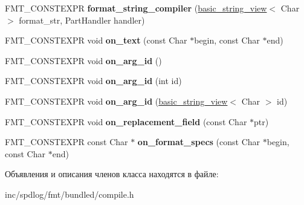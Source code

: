 \begin{DoxyCompactItemize}
\item 
\mbox{\label{classinternal_1_1format__string__compiler_a349271d053dded6e67e59e7a1b8a06c8}} 
F\+M\+T\+\_\+\+C\+O\+N\+S\+T\+E\+X\+PR {\bfseries format\+\_\+string\+\_\+compiler} (\hyperlink{classbasic__string__view}{basic\+\_\+string\+\_\+view}$<$ Char $>$ format\+\_\+str, Part\+Handler handler)
\item 
\mbox{\label{classinternal_1_1format__string__compiler_ac5ab4bc988677cd0ad3ccac51a6b5dd5}} 
F\+M\+T\+\_\+\+C\+O\+N\+S\+T\+E\+X\+PR void {\bfseries on\+\_\+text} (const Char $\ast$begin, const Char $\ast$end)
\item 
\mbox{\label{classinternal_1_1format__string__compiler_af84fedcdb2b72f0d372924ba7e984aad}} 
F\+M\+T\+\_\+\+C\+O\+N\+S\+T\+E\+X\+PR void {\bfseries on\+\_\+arg\+\_\+id} ()
\item 
\mbox{\label{classinternal_1_1format__string__compiler_ac0d26426d8041becd8d647830b106bd7}} 
F\+M\+T\+\_\+\+C\+O\+N\+S\+T\+E\+X\+PR void {\bfseries on\+\_\+arg\+\_\+id} (int id)
\item 
\mbox{\label{classinternal_1_1format__string__compiler_ab755dd97ab89ba02165be9964e855c55}} 
F\+M\+T\+\_\+\+C\+O\+N\+S\+T\+E\+X\+PR void {\bfseries on\+\_\+arg\+\_\+id} (\hyperlink{classbasic__string__view}{basic\+\_\+string\+\_\+view}$<$ Char $>$ id)
\item 
\mbox{\label{classinternal_1_1format__string__compiler_ab30f99e93c0adaa7367e8902b81b64fa}} 
F\+M\+T\+\_\+\+C\+O\+N\+S\+T\+E\+X\+PR void {\bfseries on\+\_\+replacement\+\_\+field} (const Char $\ast$ptr)
\item 
\mbox{\label{classinternal_1_1format__string__compiler_a6e87a01d16b81081dc1c4ff27b6407f0}} 
F\+M\+T\+\_\+\+C\+O\+N\+S\+T\+E\+X\+PR const Char $\ast$ {\bfseries on\+\_\+format\+\_\+specs} (const Char $\ast$begin, const Char $\ast$end)
\end{DoxyCompactItemize}


Объявления и описания членов класса находятся в файле\+:\begin{DoxyCompactItemize}
\item 
inc/spdlog/fmt/bundled/compile.\+h\end{DoxyCompactItemize}
